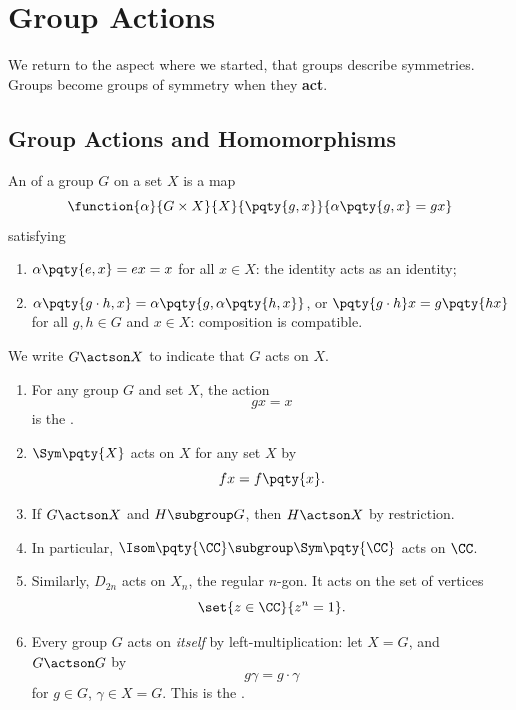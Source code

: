 \section{Group Actions}
\label{sec:group-actions}

We return to the aspect where we started, that groups describe symmetries. Groups become groups of symmetry when they \textbf{act}.

\subsection{Group Actions and Homomorphisms}
\label{sec:group-actions-homomorphisms}

\begin{definition}
    \label{def:group-action}%
    An  of a group \(G\) on a set \(X\) is a map
    \[
        \function{\alpha}{G \times X}{X}{\pqty{g, x}}{\alpha\pqty{g, x} = gx}
    \]
    satisfying
    \begin{enumerate}
        \item \(\alpha\pqty{e, x} = ex = x\) for all \(x \in X\): the identity acts as an identity;
        \item \(\alpha\pqty{g \cdot h, x} = \alpha\pqty{g, \alpha\pqty{h, x}}\), or \(\pqty{g \cdot h}x = g \pqty{hx}\) for all \(g, h \in G\) and \(x \in X\): composition is compatible.
    \end{enumerate}

    We write \(G \actson X\) to indicate that \(G\) acts on \(X\).
\end{definition}

\begin{examples*}
    \begin{enumerate}
        \item For any group \(G\) and set \(X\), the action
        \[
            gx = x
        \]
        is the .
        \item \(\Sym\pqty{X}\) acts on \(X\) for any set \(X\) by
        \[
            fx = f\pqty{x}.
        \]
        \item If \(G \actson X\) and \(H \subgroup G\), then \(H \actson X\) by restriction.
        \item In particular, \(\Isom\pqty{\CC} \subgroup \Sym\pqty{\CC}\) acts on \(\CC\).
        \item Similarly, \(D_{2n}\) acts on \(X_n\), the regular \(n\)-gon. It acts on the set of vertices
        \[
            \set{z \in \CC}{z^n = 1}.
        \]
        \item Every group \(G\) acts on \emph{itself} by left-multiplication: let \(X = G\), and \(G \actson G\) by
        \[
            g\gamma = g \cdot \gamma
        \]
        for \(g \in G\), \(\gamma \in X = G\). This is the .
    \end{enumerate}
\end{examples*}

